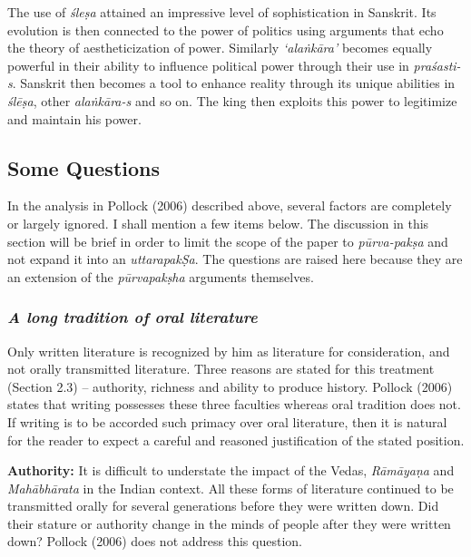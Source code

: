 The use of {\sl śleṣa} attained an impressive level of sophistication in Sanskrit. Its evolution is then connected to the power of politics using arguments that echo the theory of aestheticization of power. Similarly {\sl `alaṅkāra'} becomes equally powerful in their ability to influence political power through their use in {\sl praśasti-s}. Sanskrit then becomes a tool to enhance reality through its unique abilities in {\sl ślēṣa}, other {\sl alaṅkāra-s} and so on. The king then exploits this power to legitimize and maintain his power.

\subsection{Some Questions}

In the analysis in Pollock (2006) described above, several factors are completely or largely ignored. I shall mention a few items below. The discussion in this section will be brief in order to limit the scope of the paper to {\sl pūrva-pakṣa} and not expand it into an {\sl uttarapakṢa}. The questions are raised here because they are an extension of the {\sl pūrvapakṣha} arguments themselves. 

\subsubsection{{\sl A long tradition of oral literature}}

Only written literature is recognized by him as literature for consideration, and not orally transmitted literature. Three reasons are stated for this treatment (Section 2.3) – authority, richness and ability to produce history. Pollock (2006) states that writing possesses these three faculties whereas oral tradition does not. If writing is to be accorded such primacy over oral literature, then it is natural for the reader to expect a careful and reasoned justification of the stated position.

{\bf Authority:} It is difficult to understate the impact of the Vedas, {\sl Rāmāyaṇa} and {\sl Mahābhārata} in the Indian context. All these forms of literature continued to be transmitted orally for several generations before they were written down. Did their stature or authority change in the minds of people after they were written down?  Pollock (2006) does not address this question.

